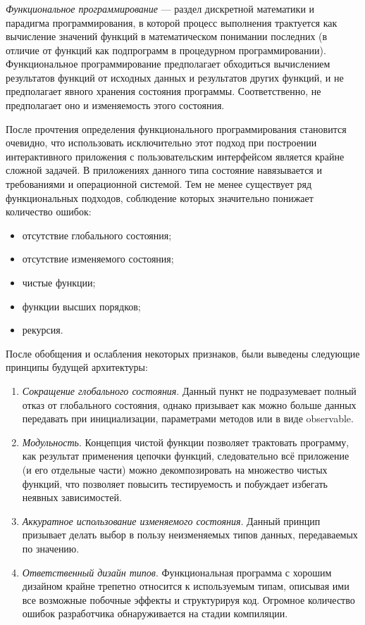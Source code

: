 \subsubsection{}
\label{sec:analysis:research:mobArch:fp}

\emph{Функциональное программирование} --- раздел дискретной математики и парадигма программирования, в которой процесс выполнения трактуется как вычисление значений функций в математическом понимании последних (в отличие от функций как подпрограмм в процедурном программировании). Функциональное программирование предполагает обходиться вычислением результатов функций от исходных данных и результатов других функций, и не предполагает явного хранения состояния программы. Соответственно, не предполагает оно и изменяемость этого состояния\cite{wiki:fp}.

После прочтения определения функционального программирования становится очевидно, что использовать исключительно этот подход при построении интерактивного приложения с пользовательским интерфейсом является крайне сложной задачей. В приложениях данного типа состояние навязывается и требованиями и операционной системой. Тем не менее существует ряд функциональных подходов, соблюдение которых значительно понижает количество ошибок:

\begin{itemize}
\item отсутствие глобального состояния;
\item отсутствие изменяемого состояния;
\item чистые функции;
\item функции высших порядков;
\item рекурсия.
\end{itemize}

После обобщения и ослабления некоторых признаков, были выведены следующие принципы будущей архитектуры:

\begin{enumerate}
\item \emph{Сокращение глобального состояния}. Данный пункт не подразумевает полный отказ от глобального состояния, однако призывает как можно больше данных передавать при инициализации, параметрами методов или в виде \gls{observable}.
\item \emph{Модульность}. Концепция чистой функции позволяет трактовать программу, как результат применения цепочки функций, следовательно всё приложение (и его отдельные части) можно декомпозировать на множество чистых функций, что позволяет повысить тестируемость и побуждает избегать неявных зависимостей.
\item \emph {Аккуратное использование изменяемого состояния}. Данный принцип призывает делать выбор в пользу неизменяемых типов данных, передаваемых по значению. 
\item \emph {Ответственный дизайн типов}. Функциональная программа с хорошим дизайном крайне трепетно относится к используемым типам, описывая ими все возможные побочные эффекты и структурируя код. Огромное количество ошибок разработчика обнаруживается на стадии компиляции.
\end{enumerate}

